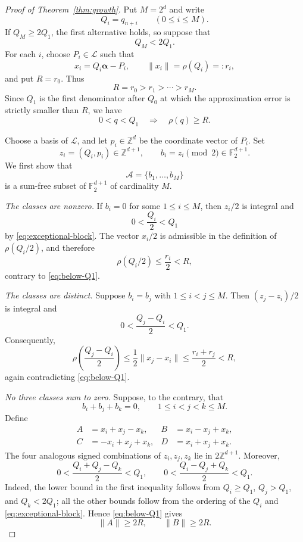 \documentclass[11pt,reqno]{amsart}
\theoremstyle{definition}
\newcommand{\F}{\mathbb F}
\newcommand{\Z}{\mathbb Z}
\newcommand{\0}{\mbf 0}%
\def\Z{\mathbb Z}
\newcommand{\cL}{\mathcal L}
\newcommand{\balpha}{\boldsymbol{\alpha}}
\begin{document}
\begin{proof}[Proof of Theorem~\ref{thm:growth}]
Put $M=2^d$ and write
$$
 Q_i=q_{n+i}\qquad(0\le i\le M).
$$
If $Q_M\ge2Q_1$, the first alternative holds, so suppose that
\begin{equation}\label{eq:exceptional-block}
 Q_M<2Q_1.
\end{equation}
For each $i$, choose $P_i\in\cL$ such that
$$
 x_i=Q_i\balpha-P_i,
 \qquad \|x_i\|=\rho(Q_i)=:r_i,
$$
and put $R=r_0$. Thus
\begin{equation}\label{eq:errors}
 R=r_0>r_1>\cdots>r_M.
\end{equation}
Since $Q_1$ is the first denominator after $Q_0$ at which the approximation
error is strictly smaller than $R$, we have
\begin{equation}\label{eq:below-Q1}
 0<q<Q_1\quad\Longrightarrow\quad \rho(q)\ge R.
\end{equation}

Choose a basis of $\cL$, and let $p_i\in\Z^d$ be the coordinate vector of
$P_i$. Set
$$
 z_i=(Q_i,p_i)\in\Z^{d+1},
 \qquad b_i=z_i\pmod 2\in\F_2^{d+1}.
$$
We first show that
$$
 \mathcal A=\{b_1,\ldots,b_M\}
$$
is a sum-free subset of $\F_2^{d+1}$ of cardinality $M$.

\smallskip
\noindent\emph{The classes are nonzero.}
If $b_i=0$ for some $1\le i\le M$, then $z_i/2$ is integral and
$$
 0<\frac{Q_i}{2}<Q_1
$$
by \eqref{eq:exceptional-block}. The vector $x_i/2$ is admissible in the
definition of $\rho(Q_i/2)$, and therefore
$$
 \rho(Q_i/2)\le\frac{r_i}{2}<R,
$$
contrary to \eqref{eq:below-Q1}.

\smallskip
\noindent\emph{The classes are distinct.}
Suppose $b_i=b_j$ with $1\le i<j\le M$. Then $(z_j-z_i)/2$ is integral and
$$
 0<\frac{Q_j-Q_i}{2}<Q_1.
$$
Consequently,
$$
 \rho\left(\frac{Q_j-Q_i}{2}\right)
 \le\frac12\|x_j-x_i\|
 \le\frac{r_i+r_j}{2}<R,
$$
again contradicting \eqref{eq:below-Q1}.

\smallskip
\noindent\emph{No three classes sum to zero.}
Suppose, to the contrary, that
\begin{equation}\label{eq:zero-sum-triple}
 b_i+b_j+b_k=0,
 \qquad 1\le i<j<k\le M.
\end{equation}
Define
$$
 \begin{aligned}
 A&=x_i+x_j-x_k,&
 B&=x_i-x_j+x_k,\\
 C&=-x_i+x_j+x_k,&
 D&=x_i+x_j+x_k.
 \end{aligned}
$$
The four analogous signed combinations of $z_i,z_j,z_k$ lie in
$2\Z^{d+1}$. Moreover,
$$
 0<\frac{Q_i+Q_j-Q_k}{2}<Q_1,
 \qquad
 0<\frac{Q_i-Q_j+Q_k}{2}<Q_1.
$$
Indeed, the lower bound in the first inequality follows from
$Q_i\ge Q_1$, $Q_j>Q_1$, and $Q_k<2Q_1$; all the other bounds follow from
the ordering of the $Q_i$ and \eqref{eq:exceptional-block}. Hence
\eqref{eq:below-Q1} gives
\begin{equation}\label{eq:AB-long}
 \|A\|\ge2R,\qquad \|B\|\ge2R.
\end{equation}


\end{proof}
\end{document}
